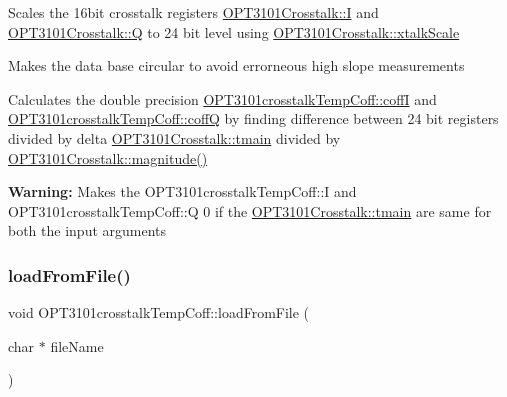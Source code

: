 \begin{DoxyItemize}
\item Scales the 16bit crosstalk registers \mbox{\hyperlink{class_o_p_t3101_crosstalk_a382c8271e35b33821b22d612466c96c7}{O\+P\+T3101\+Crosstalk\+::I}} and \mbox{\hyperlink{class_o_p_t3101_crosstalk_a0454e10774015dd2e941f9284ea516da}{O\+P\+T3101\+Crosstalk\+::Q}} to 24 bit level using \mbox{\hyperlink{class_o_p_t3101_crosstalk_a5a84d979d127f7624e6f19830b739d5e}{O\+P\+T3101\+Crosstalk\+::xtalk\+Scale}}
\item Makes the data base circular to avoid errorneous high slope measurements
\item Calculates the double precision \mbox{\hyperlink{class_o_p_t3101crosstalk_temp_coff_ac111d5555887277804f4b0ee8f555349}{O\+P\+T3101crosstalk\+Temp\+Coff\+::coffI}} and \mbox{\hyperlink{class_o_p_t3101crosstalk_temp_coff_a6d2ce80b4e1936571777185f302305b5}{O\+P\+T3101crosstalk\+Temp\+Coff\+::coffQ}} by finding difference between 24 bit registers divided by delta \mbox{\hyperlink{class_o_p_t3101_crosstalk_af5ac7c2a662a32e1ad954412a3c8d6ea}{O\+P\+T3101\+Crosstalk\+::tmain}} divided by \mbox{\hyperlink{class_o_p_t3101_crosstalk_acb6217116c652bc7c0c84e7b86504f18}{O\+P\+T3101\+Crosstalk\+::magnitude()}}
\item {\bfseries Warning\+:} Makes the O\+P\+T3101crosstalk\+Temp\+Coff\+::I and O\+P\+T3101crosstalk\+Temp\+Coff\+::Q 0 if the \mbox{\hyperlink{class_o_p_t3101_crosstalk_af5ac7c2a662a32e1ad954412a3c8d6ea}{O\+P\+T3101\+Crosstalk\+::tmain}} are same for both the input arguments 
\end{DoxyItemize}\mbox{\label{class_o_p_t3101crosstalk_temp_coff_a1335cf4cf57650284c93232d93c49ef0}} 
\subsubsection{\texorpdfstring{load\+From\+File()}{loadFromFile()}}
{\footnotesize\ttfamily void O\+P\+T3101crosstalk\+Temp\+Coff\+::load\+From\+File (\begin{DoxyParamCaption}\item[{char $\ast$}]{file\+Name }\end{DoxyParamCaption})}



